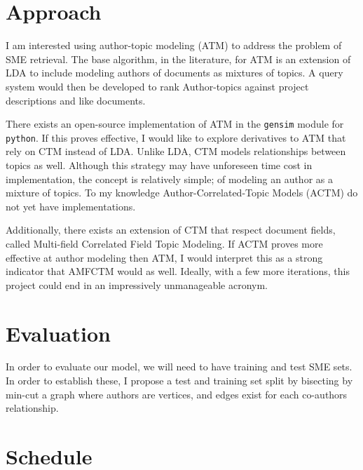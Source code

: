\documentclass{article}
\begin{document}
\begin{multicols}{2}
\section{Approach}

I am interested using author-topic\cite{Rosen-Zvi2004} modeling (ATM) to address the
problem of SME retrieval. The base algorithm, in the literature, for ATM is an
extension of LDA to include modeling authors of documents as mixtures of topics. A
query system would then be developed to rank Author-topics against project
descriptions and like documents.

There exists an open-source implementation of ATM in the \texttt{gensim}\cite{rehurek_lrec}
module for \texttt{python}. If this proves effective, I would like to explore
derivatives to ATM that rely on CTM instead of LDA. Unlike LDA, CTM models
relationships between topics as well. Although this strategy may have unforeseen time
cost in implementation, the concept is relatively simple; of modeling an author as a
mixture of topics. To my knowledge Author-Correlated-Topic Models (ACTM) do not yet
have implementations.

Additionally, there exists an extension of CTM that respect document fields, called
Multi-field Correlated Field Topic Modeling\cite{Salomatin2009MultifieldCT}. If ACTM
proves more effective at author modeling then ATM, I would interpret this as a strong
indicator that AMFCTM would as well. Ideally, with a few more iterations, this
project could end in an impressively unmanageable acronym.


\section{Evaluation}

In order to evaluate our model, we will need to have training and test SME sets. In
order to establish these, I propose a test and training set split by bisecting by
min-cut\cite{Feige2002} a graph where authors are vertices, and edges exist for each
co-authors relationship.

\section{Schedule}


\begin{comment}


\end{comment}
\end{multicols}
\end{document}
